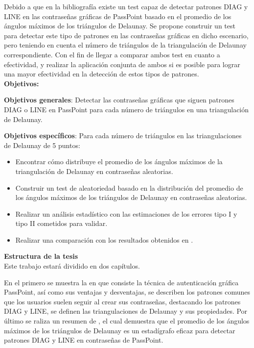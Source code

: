 \documentclass[12pt]{report}
\begin{document}
	\normalsize{
		Debido a que en la bibliografía existe un test capaz de detectar patrones DIAG y LINE en las contraseñas gráficas de PassPoint basado en el promedio de los ángulos máximos de los triángulos de Delaunay. Se propone construir un test para detectar este tipo de patrones en las contraseñas gráficas en dicho escenario, pero teniendo en cuenta el número de triángulos de la triangulación de Delaunay correspondiente. Con el fin de llegar a comparar ambos test en cuanto a efectividad, y realizar la aplicación conjunta de ambos si es posible para lograr una mayor efectividad en la detección de estos tipos de patrones.
		}\\

	\large{\textbf{Objetivos:}}
	
	\normalsize{\textbf{Objetivos generales}}: Detectar las contraseñas gráficas que siguen patrones DIAG o LINE en PassPoint para cada número de triángulos en una triangulación de Delaunay.
	
	\normalsize{\textbf{Objetivos específicos}}:
	Para cada número de triángulos  en las triangulaciones de Delaunay de 5 puntos:
	
	\begin{itemize}
		\item Encontrar cómo distribuye el promedio de los ángulos máximos de la triangulación de Delaunay en contraseñas aleatorias.
		\item Construir un test de aleatoriedad basado en la distribución del promedio de los ángulos máximos de los triángulos de Delaunay en contraseñas aleatorias.
		
		\item Realizar un análisis estadístico con las estimaciones de los errores tipo I y tipo II cometidos para validar.
		
		\item Realizar una comparación con los resultados obtenidos en \cite{13}.
		
	\end{itemize}
	
	
	{\large{\textbf{Estructura de la tesis}}}\\
	
	Este trabajo estará dividido en dos capítulos.
	
	En el primero se muestra la en que consiste la técnica de autenticación gráfica PassPoint, así como sus ventajas y desventajas, se describen los patrones comunes que los usuarios suelen seguir al crear sus contraseñas, destacando los patrones DIAG y LINE, se definen las triangulaciones de Delaunay y sus propiedades. Por último se raliza un resumen de \cite{13}, el cual demuestra que el promedio de los ángulos máximos de los  triángulos de Delaunay es un estadígrafo eficaz para detectar patrones DIAG y LINE en contraseñas de PassPoint.
	
\end{document}

